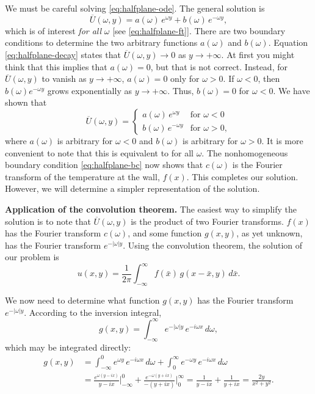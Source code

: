 We must be careful solving \eqref{eq:halfplane-ode}.  The general solution is
\begin{equation}
\label{eq:halfplane-gen}
\overline{U}(\omega,y) = a(\omega)\,e^{\omega y} + b(\omega)\,e^{-\omega y},
\end{equation}
which is of interest \textit{for all} $\omega$ [see \eqref{eq:halfplane-ft}].  There are two boundary conditions to determine the two arbitrary functions $a(\omega)$ and $b(\omega)$.  Equation \eqref{eq:halfplane-decay} states that $\overline{U}(\omega,y) \to 0$ as $y \to +\infty$.  At first you might think that this implies that $a(\omega) = 0$, but that is not correct.  Instead, for $\overline{U}(\omega,y)$ to vanish as $y \to +\infty$, $a(\omega) = 0$ only for $\omega > 0$.  If $\omega < 0$, then $b(\omega)e^{-\omega y}$ grows exponentially as $y \to +\infty$.  Thus, $b(\omega) = 0$ for $\omega < 0$.  We have shown that
\[
\overline{U}(\omega,y) = \begin{cases} a(\omega)\,e^{\omega y} & \text{for } \omega < 0 \\ b(\omega)\,e^{-\omega y} & \text{for } \omega > 0, \end{cases}
\]
where $a(\omega)$ is arbitrary for $\omega < 0$ and $b(\omega)$ is arbitrary for $\omega > 0$.  It is more convenient to note that this is equivalent to
for all $\omega$.  The nonhomogeneous boundary condition \eqref{eq:halfplane-bc} now shows that $c(\omega)$ is the Fourier transform of the temperature at the wall, $f(x)$.  This completes our solution.  However, we will determine a simpler representation of the solution.

\textbf{Application of the convolution theorem.}  The easiest way to simplify the solution is to note that $\overline{U}(\omega,y)$ is the product of two Fourier transforms.  $f(x)$ has the Fourier transform $c(\omega)$, and some function $g(x,y)$, as yet unknown, has the Fourier transform $e^{-|\omega|y}$.  Using the convolution theorem, the solution of our problem is
\begin{equation}
\label{eq:halfplane-conv}
u(x,y) = \frac{1}{2\pi}\int_{-\infty}^{\infty}f(\bar{x})\,g(x-\bar{x},y)\,d\bar{x}.
\end{equation}

We now need to determine what function $g(x,y)$ has the Fourier transform $e^{-|\omega|y}$.  According to the inversion integral,
\[
g(x,y) = \int_{-\infty}^{\infty}e^{-|\omega|y}\,e^{-i\omega x}\,d\omega,
\]
which may be integrated directly:
\begin{align*}
g(x,y) &= \int_{-\infty}^0 e^{\omega y}\,e^{-i\omega x}\,d\omega + \int_0^{\infty}e^{-\omega y}\,e^{-i\omega x}\,d\omega \\
&= \frac{e^{\omega(y-ix)}}{y-ix}\bigg|_{-\infty}^0 + \frac{e^{-\omega(y+ix)}}{-(y+ix)}\bigg|_0^{\infty} = \frac{1}{y-ix} + \frac{1}{y+ix} = \frac{2y}{x^2+y^2}.
\end{align*}

